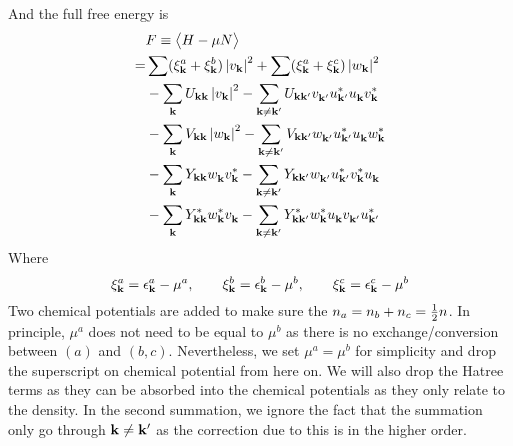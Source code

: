 And the full free energy is 
\begin{equation}\label{eq:uvw:F}
 \begin{split}
  &F\equiv\bigl<{H-\mu{}N}\bigr>\\
    =&\sum(\xi^a_{\mathbf{k}}+\xi^b_{\mathbf{k}})\left\lvert{v_{\ensuremath{\mathbf{k}}}}\right\rvert^2+\sum(\xi^a_{\mathbf{k}}+\xi^c_{\mathbf{k}})\left\lvert{w_{\ensuremath{\mathbf{k}}}}\right\rvert^2\\
    &-\sum_{\mathbf{k}}U_{\mathbf{k}\mathbf{k}}\left\lvert{v_{\ensuremath{\mathbf{k}}}}\right\rvert^2-\sum_{\mathbf{k}\neq\mathbf{k}'}U_{\mathbf{k}\mathbf{k}'}v^{}_{\mathbf{k}'}u^*_{\mathbf{k}'}u^{}_{\mathbf{k}}{}v^*_{\mathbf{k}}\\
    &-\sum_{\mathbf{k}}V_{\mathbf{k}\mathbf{k}}\left\lvert{w_{\ensuremath{\mathbf{k}}}}\right\rvert^2
      -\sum_{\mathbf{k}\neq\mathbf{k}'}V_{\mathbf{k}\mathbf{k}'}w^{}_{\mathbf{k}'}u^*_{\mathbf{k}'}u^{}_{\mathbf{k}}{}w^*_{\mathbf{k}}\\
    &-\sum_{\mathbf{k}}Y_{\mathbf{k}\mathbf{k}}w^{}_{\mathbf{k}}v^*_{\mathbf{k}}{}
      -\sum_{\mathbf{k}\neq\mathbf{k}'}Y_{\mathbf{k}\mathbf{k}'}w^{}_{\mathbf{k}'}{u^{*}_{\mathbf{k}'}}v^*_{\mathbf{k}}{}u^{}_{\mathbf{k}}\\
    &-\sum_{\mathbf{k}}Y^*_{\mathbf{k}\mathbf{k}}w^*_{\mathbf{k}}v^{}_{\mathbf{k}}{}
      -\sum_{\mathbf{k}\neq\mathbf{k}'}Y^*_{\mathbf{k}\mathbf{k}'}w^*_{\mathbf{k}}{u^{}_{\mathbf{k}}}v^{}_{\mathbf{k}'}{}u^{*}_{\mathbf{k}'}
 \end{split}
\end{equation}
Where 
\begin{equation*}
 \xi^a_{\mathbf{k}}=\epsilon^a_{\mathbf{k}}-\mu^a,\qquad\xi^b_{\mathbf{k}}=\epsilon^b_{\mathbf{k}}-\mu^b,\qquad\xi^c_{\mathbf{k}}=\epsilon^c_{\mathbf{k}}-\mu^b
\end{equation*}
Two chemical potentials are added to make sure the $n_a=n_b+n_c=\frac{1}{2}n$.  In principle, $\mu^{a}$ does not need to be equal to $\mu^{b}$  as there is no exchange/conversion between $(a)$ and $(b,c)$.  Nevertheless, we  set $\mu^{a}=\mu^{b}$ for simplicity and drop the superscript on chemical potential from here on. 
We will also drop the Hatree terms as they can be absorbed into the chemical potentials as they only relate to the density.   In the second summation, we ignore the fact that the summation only go through $\mathbf{k}\neq\mathbf{k}'$ as the correction due to this is in the higher order. 
 
